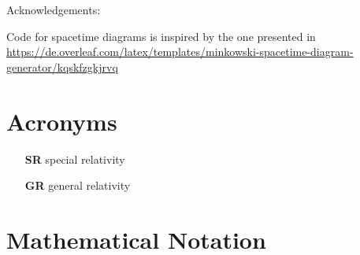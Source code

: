 



\makeindex





\pagestyle{plain.scrheadings}





\setcounter{page}{0}
\thispagestyle{empty}


\newpage


\begin{center}
Acknowledgements:

Code for spacetime diagrams is inspired by the one presented in \url{https://de.overleaf.com/latex/templates/minkowski-spacetime-diagram-generator/kqskfzgkjrvq}
\end{center}



\newpage



{
\hypersetup{linkcolor=black}
\tableofcontents
}

\newpage

{
\hypersetup{linkcolor=black}
\listoffigures
}

\newpage


\iffalse
{
\hypersetup{linkcolor=black}
\listoftables
}


\newpage

\fi



\section*{Acronyms}

\begin{itemize}
	\item[\textbf{SR}] special relativity

	\item[\textbf{GR}] general relativity
\end{itemize}



\section*{Mathematical Notation}

